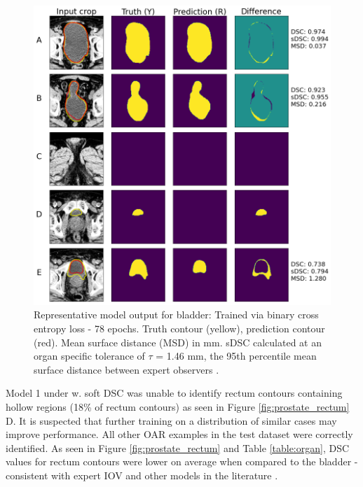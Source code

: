 \begin{figure}[H]
	\begin{center}
		\includegraphics[width=1.0\textwidth]{figures/prostate_BCE_bladder}
		\caption{Representative model output for bladder: Trained via binary cross entropy loss - 78 epochs. Truth contour (yellow), prediction contour (red). Mean surface distance (MSD) in mm. sDSC \cite{Nikolov_2018} calculated at an organ specific tolerance of $\tau$ = 1.46 mm, the 95th percentile mean surface distance between expert observers \cite{Roach_2019}.}
		\label{fig:prostate_BCE_bladder}
	\end{center}
\end{figure}

Model 1 under w. soft DSC was unable to identify rectum contours containing hollow regions (18\% of rectum contours) as seen in Figure \ref{fig:prostate_rectum} D. It is suspected that further training on a distribution of similar cases may improve performance. All other OAR examples in the test dataset were correctly identified. As seen in Figure \ref{fig:prostate_rectum} and Table \ref{table:organ}, DSC values for rectum contours were lower on average when compared to the bladder - consistent with expert IOV \cite{Roach_2019} and other models in the literature \cite{Liu_2020, Kazemifar_2018, Wong2020}.




